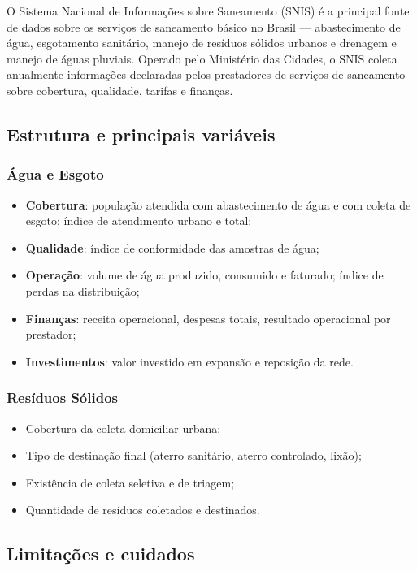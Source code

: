O Sistema Nacional de Informações sobre Saneamento (SNIS) é a principal fonte de dados sobre os serviços de saneamento básico no Brasil --- abastecimento de água, esgotamento sanitário, manejo de resíduos sólidos urbanos e drenagem e manejo de águas pluviais. Operado pelo Ministério das Cidades, o SNIS coleta anualmente informações declaradas pelos prestadores de serviços de saneamento sobre cobertura, qualidade, tarifas e finanças.

\subsection{Estrutura e principais variáveis}

\subsubsection{Água e Esgoto}

\begin{itemize}
  \item \textbf{Cobertura}: população atendida com abastecimento de água e com coleta de esgoto; índice de atendimento urbano e total;
  \item \textbf{Qualidade}: índice de conformidade das amostras de água;
  \item \textbf{Operação}: volume de água produzido, consumido e faturado; índice de perdas na distribuição;
  \item \textbf{Finanças}: receita operacional, despesas totais, resultado operacional por prestador;
  \item \textbf{Investimentos}: valor investido em expansão e reposição da rede.
\end{itemize}

\subsubsection{Resíduos Sólidos}

\begin{itemize}
  \item Cobertura da coleta domiciliar urbana;
  \item Tipo de destinação final (aterro sanitário, aterro controlado, lixão);
  \item Existência de coleta seletiva e de triagem;
  \item Quantidade de resíduos coletados e destinados.
\end{itemize}

\subsection{Limitações e cuidados}

